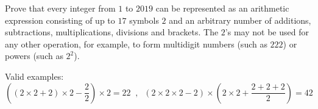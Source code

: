 Prove that every integer from $1$ to $2019$ can be represented as an arithmetic expression consisting of up to $17$ symbols $2$ and an arbitrary number of additions, subtractions, multiplications, divisions and brackets. The $2$'s may not be used for any other operation, for example, to form multidigit numbers (such as $222$) or powers (such as $2^2$).

Valid examples: $$\left((2\times 2+2)\times 2-\frac{2}{2}\right)\times 2=22 \;\;, \;\; (2\times2\times 2-2)\times \left(2\times 2 +\frac{2+2+2}{2}\right)=42$$